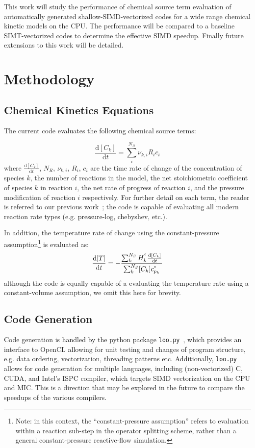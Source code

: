 \documentclass[12pt]{ussci}
\begin{document}
This work will study the performance of chemical source term evaluation of automatically generated shallow-SIMD-vectorized codes for a wide range chemical kinetic models on the CPU.
The performance will be compared to a baseline SIMT-vectorized codes to determine the effective SIMD speedup.
Finally future extensions to this work will be detailed.

\section{Methodology}
\subsection{Chemical Kinetics Equations}
The current code evaluates the following chemical source terms:

\begin{equation}
\frac{\text{d}[C_k]}{\text{d}t} = \sum_{i}^{N_R} \nu_{k,i} R_i c_i
\end{equation}
where $\frac{\text{d}[C_k]}{\text{d}t}$, $N_R$, $\nu_{k,i}$, ${R_i}$, $c_i$ are the time rate of change of the concentration of species $k$, the number of reactions in the model, the net stoichiometric coefficient of species $k$ in reaction $i$, the net rate of progress of reaction $i$, and the pressure modification of reaction $i$ respectively.
For further detail on each term, the reader is referred to our previous work~\cite{Niemeyer:2016aa}; the code is capable of evaluating all modern reaction rate types (e.g. pressure-log, chebyshev, etc.).

In addition, the temperature rate of change using the constant-pressure assumption\footnote{Note: in this context, the ``constant-pressure assumption'' refers to evaluation within a reaction sub-step in the operator splitting scheme, rather than a general constant-pressure reactive-flow simulation.} is evaluated as:
\begin{equation}
\frac{\text{d}[T]}{\text{d}t} = -\frac{\sum_{k}^{N_S} H^{\degree}_k \frac{\text{d}[C_k]}{\text{d}t}}{\sum_{k}^{N_S} [C_k] c_{p_k}^{\degree}}
\end{equation}
although the code is equally capable of a evaluating the temperature rate using a constant-volume assumption, we omit this here for brevity.

\subsection{Code Generation}
Code generation is handled by the python package \texttt{loo.py}~\cite{kloeckner_loopy_2014}, which provides an interface to OpenCL allowing for unit testing and changes of program structure, e.g. data ordering, vectorization, threading patterns etc.
Additionally, \texttt{loo.py} allows for code generation for multiple languages, including (non-vectorized) C, CUDA, and Intel's ISPC compiler, which targets SIMD vectorization on the CPU and MIC.
This is a direction that may be explored in the future to compare the speedups of the various compilers.
\end{document}
